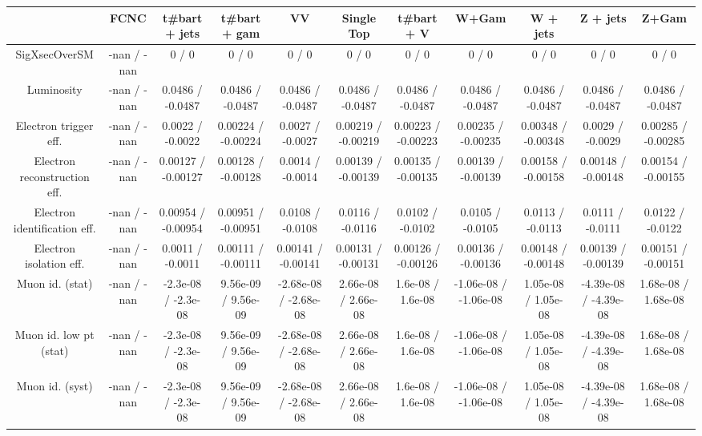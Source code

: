 \begin{table}[htbp]
\begin{center}
\footnotesize
\begin{tabular}{|c|c|c|c|c|c|c|c|c|c|c|}
\hline 
      & FCNC      & t#bar{t} + jets      & t#bar{t} +  gam      & VV      & Single Top      & t#bar{t} + V      & W+Gam      & W + jets      & Z + jets      & Z+Gam \\ 
\hline 
 SigXsecOverSM & -nan / -nan & 0 / 0 & 0 / 0 & 0 / 0 & 0 / 0 & 0 / 0 & 0 / 0 & 0 / 0 & 0 / 0 & 0 / 0 \\ 
  Luminosity & -nan / -nan & 0.0486 / -0.0487 & 0.0486 / -0.0487 & 0.0486 / -0.0487 & 0.0486 / -0.0487 & 0.0486 / -0.0487 & 0.0486 / -0.0487 & 0.0486 / -0.0487 & 0.0486 / -0.0487 & 0.0486 / -0.0487 \\ 
  Electron trigger eff. & -nan / -nan & 0.0022 / -0.0022 & 0.00224 / -0.00224 & 0.0027 / -0.0027 & 0.00219 / -0.00219 & 0.00223 / -0.00223 & 0.00235 / -0.00235 & 0.00348 / -0.00348 & 0.0029 / -0.0029 & 0.00285 / -0.00285 \\ 
  Electron reconstruction eff. & -nan / -nan & 0.00127 / -0.00127 & 0.00128 / -0.00128 & 0.0014 / -0.0014 & 0.00139 / -0.00139 & 0.00135 / -0.00135 & 0.00139 / -0.00139 & 0.00158 / -0.00158 & 0.00148 / -0.00148 & 0.00154 / -0.00155 \\ 
  Electron identification eff. & -nan / -nan & 0.00954 / -0.00954 & 0.00951 / -0.00951 & 0.0108 / -0.0108 & 0.0116 / -0.0116 & 0.0102 / -0.0102 & 0.0105 / -0.0105 & 0.0113 / -0.0113 & 0.0111 / -0.0111 & 0.0122 / -0.0122 \\ 
  Electron isolation eff. & -nan / -nan & 0.0011 / -0.0011 & 0.00111 / -0.00111 & 0.00141 / -0.00141 & 0.00131 / -0.00131 & 0.00126 / -0.00126 & 0.00136 / -0.00136 & 0.00148 / -0.00148 & 0.00139 / -0.00139 & 0.00151 / -0.00151 \\ 
  Muon id. (stat) & -nan / -nan & -2.3e-08 / -2.3e-08 & 9.56e-09 / 9.56e-09 & -2.68e-08 / -2.68e-08 & 2.66e-08 / 2.66e-08 & 1.6e-08 / 1.6e-08 & -1.06e-08 / -1.06e-08 & 1.05e-08 / 1.05e-08 & -4.39e-08 / -4.39e-08 & 1.68e-08 / 1.68e-08 \\ 
  Muon id. low pt (stat) & -nan / -nan & -2.3e-08 / -2.3e-08 & 9.56e-09 / 9.56e-09 & -2.68e-08 / -2.68e-08 & 2.66e-08 / 2.66e-08 & 1.6e-08 / 1.6e-08 & -1.06e-08 / -1.06e-08 & 1.05e-08 / 1.05e-08 & -4.39e-08 / -4.39e-08 & 1.68e-08 / 1.68e-08 \\ 
  Muon id. (syst) & -nan / -nan & -2.3e-08 / -2.3e-08 & 9.56e-09 / 9.56e-09 & -2.68e-08 / -2.68e-08 & 2.66e-08 / 2.66e-08 & 1.6e-08 / 1.6e-08 & -1.06e-08 / -1.06e-08 & 1.05e-08 / 1.05e-08 & -4.39e-08 / -4.39e-08 & 1.68e-08 / 1.68e-08 \\ 

\end{tabular}
\end{center}
\end{table}
